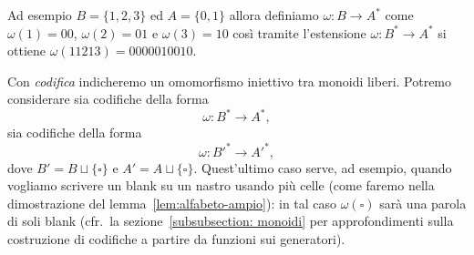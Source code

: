 \begin{exam}
Ad esempio $B = \{1,2,3\}$ ed $A = \{0,1\}$ allora definiamo $\omega\colon B \to A^*$
come $\omega(1) = 00$, $\omega(2) = 01$ e $\omega(3) = 10$ così tramite l'estensione
$\omega\colon B^* \to A^*$ si ottiene $\omega(11213) = 0000010010$.
\end{exam}
Con \emph{codifica} indicheremo un omomorfismo iniettivo tra monoidi liberi.
Potremo considerare sia codifiche della forma
\[
  \omega\colon B^* \to A^*,
\]
sia codifiche della forma
\[
  \omega\colon B'^* \to A'^*,
\]
dove $B'=B \sqcup \{\square\}$ e $A'=A \sqcup \{\square\}$. Quest'ultimo caso serve,
ad esempio, quando vogliamo scrivere un blank su un nastro usando più celle (come
faremo nella dimostrazione del lemma~\ref{lem:alfabeto-ampio}): in tal caso
$\omega(\square)$ sarà una parola di soli blank (cfr.\ la sezione~\ref{subsubsection: monoidi} per approfondimenti sulla costruzione di
codifiche a partire da funzioni sui generatori).
